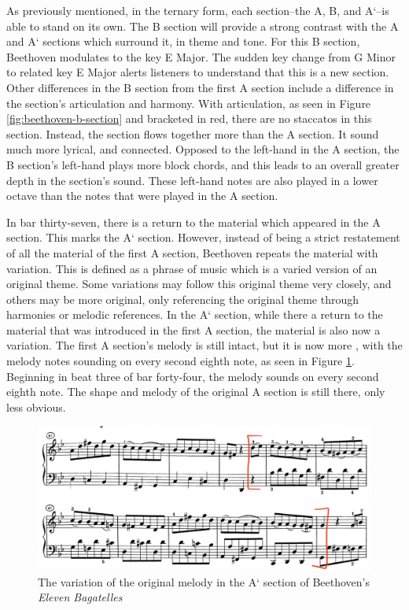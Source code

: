 As previously mentioned, in the ternary form, each section--the A, B, and A`--is able to stand on its own. The B section will provide a strong contrast with the A and A` sections which surround it, in theme and tone. For this B section, Beethoven modulates to the key E\musFlat{} Major. The sudden key change from G Minor to related key E\musFlat{} Major alerts listeners to understand that this is a new section. Other differences in the B section from the first A section include a difference in the section's articulation and harmony. With articulation, as seen in Figure \ref{fig:beethoven-b-section}\autocite{Henle_1978} and bracketed in red, there are no staccatos in this section. Instead, the section flows together more than the A section. It sound much more lyrical, and connected. Opposed to the left-hand in the A section, the B section's left-hand plays more block chords, and this leads to an overall greater depth in the section's sound. These left-hand notes are also played in a lower octave than the notes that were played in the A section. 

In bar thirty-seven, there is a return to the material which appeared in the A section. This marks the A` section. However, instead of being a strict restatement of all the material of the first A section, Beethoven repeats the material with variation. This is defined as a phrase of music which is a varied version of an original theme. Some variations may follow this original theme very closely, and others may be more original, only referencing the original theme through harmonies or melodic references.\autocite{Kennedy_Kennedy_Rutherford-Johnson_2013b} In the A` section, while there a return to the material that was introduced in the first A section, the material is also now a variation. The first A section's melody is still intact, but it is now more , with the melody notes sounding on every second eighth note, as seen in Figure \ref{fig:beethoven-a-prime-melody-variation}\autocite{Henle_1978}. Beginning in beat three of bar forty-four, the melody sounds on every second eighth note. The shape and melody of the original A section is still there, only less obvious.

\begin{figure}
	\centering
	\includegraphics[width=\textwidth]{figures/beethoven-a-prime-melody-variation}
	\caption{The variation of the original melody in the A` section of Beethoven's \textit{Eleven Bagatelles}}
	\label{fig:beethoven-a-prime-melody-variation}
\end{figure}